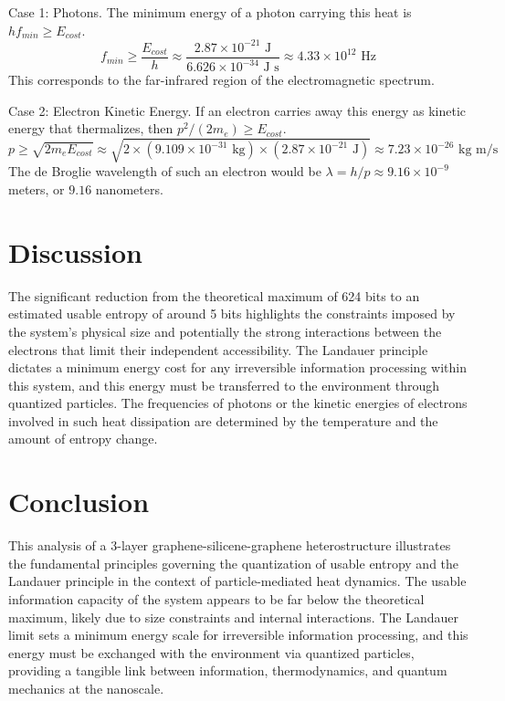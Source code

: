 \documentclass{article}
\begin{document}
		Case 1: Photons. The minimum energy of a photon carrying this heat is $h f_{min} \ge E_{cost}$.
		$$ f_{min} \ge \frac{E_{cost}}{h} \approx \frac{2.87 \times 10^{-21} \text{ J}}{6.626 \times 10^{-34} \text{ J s}} \approx 4.33 \times 10^{12} \text{ Hz} $$
		This corresponds to the far-infrared region of the electromagnetic spectrum.
		
		Case 2: Electron Kinetic Energy. If an electron carries away this energy as kinetic energy that thermalizes, then $p^2 / (2m_e) \ge E_{cost}$.
		$$ p \ge \sqrt{2 m_e E_{cost}} \approx \sqrt{2 \times (9.109 \times 10^{-31} \text{ kg}) \times (2.87 \times 10^{-21} \text{ J})} \approx 7.23 \times 10^{-26} \text{ kg m/s} $$
		The de Broglie wavelength of such an electron would be $\lambda = h / p \approx 9.16 \times 10^{-9}$ meters, or $9.16$ nanometers.
		
		\section{Discussion}
		The significant reduction from the theoretical maximum of 624 bits to an estimated usable entropy of around 5 bits highlights the constraints imposed by the system's physical size and potentially the strong interactions between the electrons that limit their independent accessibility. The Landauer principle dictates a minimum energy cost for any irreversible information processing within this system, and this energy must be transferred to the environment through quantized particles. The frequencies of photons or the kinetic energies of electrons involved in such heat dissipation are determined by the temperature and the amount of entropy change.
		
		\section{Conclusion}
		This analysis of a 3-layer graphene-silicene-graphene heterostructure illustrates the fundamental principles governing the quantization of usable entropy and the Landauer principle in the context of particle-mediated heat dynamics. The usable information capacity of the system appears to be far below the theoretical maximum, likely due to size constraints and internal interactions. The Landauer limit sets a minimum energy scale for irreversible information processing, and this energy must be exchanged with the environment via quantized particles, providing a tangible link between information, thermodynamics, and quantum mechanics at the nanoscale.
		
	
\end{document}
